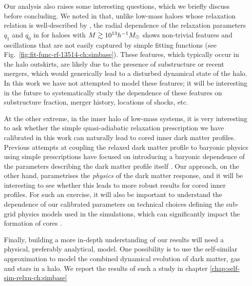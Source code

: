 Our analysis also raises some interesting questions, which we briefly discuss before concluding. We noted in  that, unlike low-mass haloes whose relaxation relation is well-described by , the radial dependence of the relaxation parameters $q_1$ and $q_0$ in  for haloes with $M\gtrsim10^{13}h^{-1}M_{\odot}$ shows non-trivial features and oscillations that are not easily captured by simple fitting functions (see Fig.~\ref{fig:fit-func-rf-13514-ch:simbase}). These features, which typically occur in the halo outskirts, are likely due to the presence of substructure or recent mergers, which would generically lead to a disturbed dynamical state of the halo. In this work we have not attempted to model these features; it will be interesting in the future to systematically study the dependence of these features on substructure fraction, merger history, locations of shocks, etc.

At the other extreme, in the inner halo of low-mass systems, it is very interesting to ask whether the simple quasi-adiabatic relaxation prescription we have calibrated in this work can naturally lead to cored inner dark matter profiles. Previous attempts at coupling the relaxed dark matter profile to baryonic physics using simple prescriptions have focused on introducing a baryonic dependence of the parameters describing the dark matter profile itself \citep[e.g.,][]{2014MNRAS.441.2986D}. Our approach, on the other hand, parametrises the \emph{physics} of the dark matter response, and it will be interesting to see whether this leads to more robust results for cored inner profiles. For such an exercise, it will also be important to understand the dependence of our calibrated parameters on technical choices defining the sub-grid physics models used in the simulations, which can significantly impact the formation of cores \citep{bfln18}. 

Finally, building a more in-depth understanding of our results will need a physical, preferably analytical, model. One possibility is to use the self-similar approximation \citep[][]{fg84,bertschinger85,launagai+15,shi16}
to model the combined dynamical evolution of dark matter, gas and stars in a halo.
We report the results of such a study in chapter \ref{chap:self-sim-relxn-ch:simbase}

 
